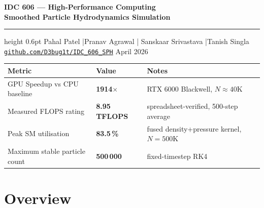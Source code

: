 \documentclass[11pt,a4paper]{article}
\begin{document}

\vspace*{-1.8cm}
{\color{white}
  \begin{center}
    \textbf{\Large IDC 606 — High-Performance Computing}\\[4pt]
    {\LARGE\bfseries Smoothed Particle Hydrodynamics Simulation}\\[6pt]
    \hrule height 0.6pt
    \vspace{6pt}
    {\normalsize
      Pahal Patel \quad|\quad Pranav Agrawal \quad|\quad
      Sanskaar Srivastava \quad|\quad Tanish Singla}\\[3pt]
    {\small\color{rulecolor}
      \href{https://github.com/D3bug1t/IDC_606_SPH}
           {\texttt{github.com/D3bug1t/IDC\_606\_SPH}}
      \quad\textbullet\quad April 2026}
  \end{center}
}
\vspace{0.5cm}

\begin{center}
\renewcommand{\arraystretch}{1.4}
\begin{tabular}{@{}lll@{}}
  \toprule
  \textbf{Metric} & \textbf{Value} & \textbf{Notes} \\
  \midrule
  GPU Speedup vs CPU baseline   & \textbf{1914$\times$}         & RTX 6000 Blackwell, $N\approx40$K \\
  Measured FLOPS rating          & \textbf{8.95\,TFLOPS}        & spreadsheet-verified, 500-step average \\
  Peak SM utilisation            & \textbf{83.5\,\%}            & fused density+pressure kernel, $N=500$K \\
  Maximum stable particle count  & \textbf{500\,000}            & fixed-timestep RK4 \\
  \bottomrule
\end{tabular}
\end{center}

\vspace{0.4cm}

\section{Overview}
\end{document}
